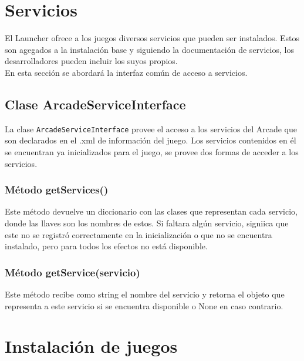 \documentclass[language=spanish]{article}
\begin{document}


\section{Servicios}

El Launcher ofrece a los juegos diversos servicios que pueden ser instalados. Estos son agegados a la instalación base y siguiendo la documentación de servicios, los desarrolladores pueden incluir los suyos propios.\\
En esta sección se abordará la interfaz común de acceso a servicios.

\subsection{Clase ArcadeServiceInterface}

La clase {\tt ArcadeServiceInterface} provee el acceso a los servicios del Arcade que son declarados en el .xml de información del juego. Los servicios contenidos en él se encuentran ya inicializados para el juego, se provee dos formas de acceder a los servicios.

\subsubsection{Método getServices()}

Este método devuelve un diccionario con las clases que representan cada servicio, donde las llaves son los nombres de estos. Si faltara algún servicio, signiica que este no se registró correctamente en la inicialización o que no se encuentra instalado, pero para todos los efectos no está disponible.

\subsubsection{Método getService(servicio)}

Este método recibe como string el nombre del servicio y retorna  el objeto que representa a este servicio si se encuentra disponible o None en caso contrario.

\section{Instalación de juegos}
\end{document}
